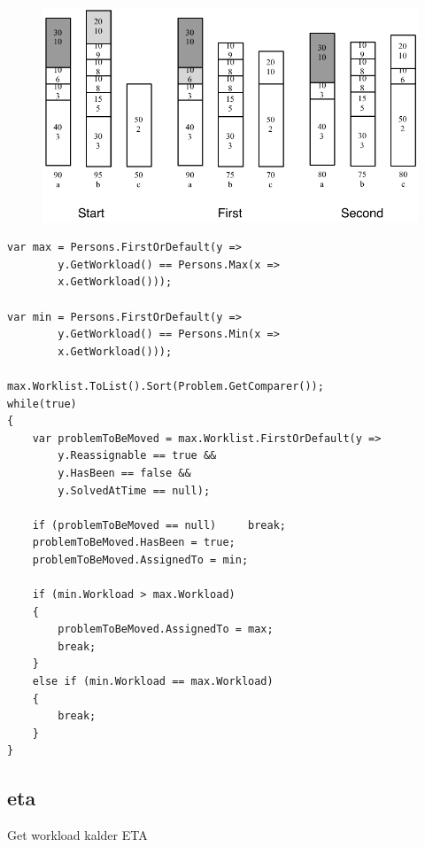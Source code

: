 

\begin{figure}
	\centering
		\includegraphics[scale=0.8]{input/implementation/key_points/balanceWorkloadDiagram.pdf}
	\label{fig:balanceWorkloadDiagram}
\end{figure}


\begin{lstlisting}[style=sourceCode, caption=\myCaption{A code snippet of the balance workload method. The presented code is within a for loop running each for every staff minus one}, label=lst:balanceWorkload]
var max = Persons.FirstOrDefault(y => 	
		y.GetWorkload() == Persons.Max(x => 
		x.GetWorkload()));                  

var min = Persons.FirstOrDefault(y => 
		y.GetWorkload() == Persons.Min(x => 
		x.GetWorkload()));
    
max.Worklist.ToList().Sort(Problem.GetComparer());             
while(true)
{
    var problemToBeMoved = max.Worklist.FirstOrDefault(y => 
		y.Reassignable == true && 
		y.HasBeen == false && 
		y.SolvedAtTime == null);
                   
    if (problemToBeMoved == null)     break; 
    problemToBeMoved.HasBeen = true;
    problemToBeMoved.AssignedTo = min;
    
    if (min.Workload > max.Workload)
    {
    	problemToBeMoved.AssignedTo = max;
    	break;
    }
    else if (min.Workload == max.Workload)
    {
		break;
    }
} 
\end{lstlisting}




\subsection{eta}
\label{}


Get workload kalder ETA